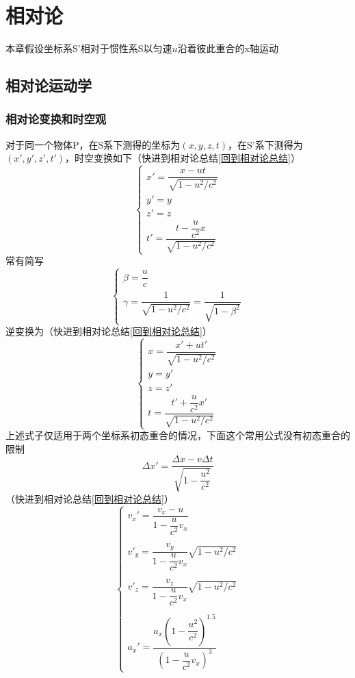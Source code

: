 \section{相对论}
本章假设坐标系S'相对于惯性系S以匀速$u$沿着彼此重合的x轴运动
\subsection{相对论运动学}
\subsubsection{相对论变换和时空观}
对于同一个物体P，在S系下测得的坐标为$(x,y,z,t)$，在S'系下测得为$(x',y',z',t')$，时空变换如下（快进到相对论总结\ref{回到相对论总结}）
\begin{equation}\label{相对论洛伦兹变换}
    \begin{cases}
        x'=\dfrac{x-ut}{\sqrt{1-u^2/c^2}}\\
        y'=y\\
        z'=z\\
        t'=\dfrac{t-\dfrac{u}{c^2}x}{\sqrt{1-u^2/c^2}}
    \end{cases}
\end{equation}
常有简写
\begin{equation}
    \begin{cases}
        \beta = \dfrac{u}{c}\\
        \gamma = \dfrac{1}{\sqrt{1-u^2/c^2}}=\dfrac{1}{\sqrt{1-\beta^2}}
    \end{cases}
\end{equation}
逆变换为（快进到相对论总结\ref{回到相对论总结}）
\begin{equation}\label{洛伦兹时空逆变换}
    \begin{cases}
        x=\dfrac{x'+ut'}{\sqrt{1-u^2/c^2}}\\
        y=y'\\
        z=z'\\
        t=\dfrac{t'+\dfrac{u}{c^2}x'}{\sqrt{1-u^2/c^2}}
    \end{cases}
\end{equation}
上述式子仅适用于两个坐标系初态重合的情况，下面这个常用公式没有初态重合的限制
\begin{equation}
    \Delta x' = \dfrac{\Delta x - v\Delta t}{\sqrt{1-\dfrac{u^2}{c^2}}}
\end{equation}
（快进到相对论总结\ref{回到相对论总结}）
\begin{equation}\label{洛伦兹速度变换与逆变换}
    \begin{cases}
        v_x'=\dfrac{v_x - u}{1-\dfrac{u}{c^2}v_x}\\
        \\
        v'_y=\dfrac{v_y}{1-\dfrac{u}{c^2}v_x}\sqrt{1-u^2/c^2}\\
        \\
        v'_z=\dfrac{v_z}{1-\dfrac{u}{c^2}v_x}\sqrt{1-u^2/c^2}\\
        \\
        a_x'=\dfrac{a_x(1-\dfrac{u^2}{c^2})^{1.5}}{(1-\dfrac{u}{c^2}v_x)^3}
    \end{cases}
\end{equation}
